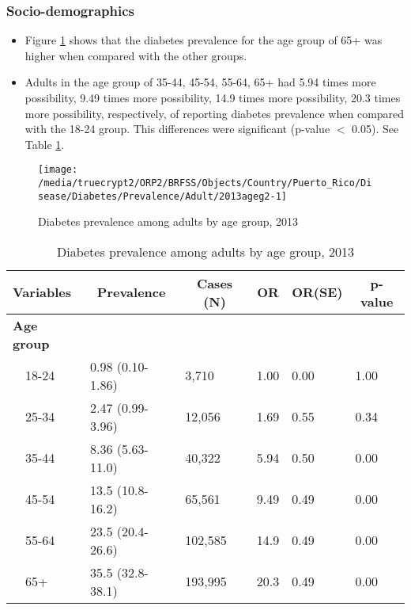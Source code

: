 \newpage
\subsubsection{Socio-demographics}

\begin{itemize}

\item Figure \ref{fig:age.Diabetes.2013} shows that the diabetes prevalence for the age group of
65+
was higher when compared with the other groups.

\item Adults in the age group of 35-44, 45-54, 55-64, 65+ had 5.94 times more possibility, 9.49 times more possibility, 14.9 times more possibility, 20.3 times more possibility, respectively, of reporting diabetes prevalence when compared with the 18-24 group. This differences were significant (p-value $<$ 0.05). See Table \ref{tab:age.Diabetes.2013}.


\end{itemize}


\begin{figure}[H]
\caption{Diabetes prevalence among adults by age group, 
2013}
\begin{knitrout}
\color{fgcolor}

{\centering \texttt{[image: /media/truecrypt2/ORP2/BRFSS/Objects/Country/Puerto\_Rico/Disease/Diabetes/Prevalence/Adult/2013ageg2-1]} 

}



\end{knitrout}
\label{fig:age.Diabetes.2013}
\end{figure}

\begin{table}[H]
\caption{Diabetes prevalence  among adults by age group, 2013\label{tab:age.Diabetes.2013}} 
\begin{center}
\begin{tabular}{llllll}
\hline\hline
\multicolumn{1}{l}{Variables}&\multicolumn{1}{c}{Prevalence}&\multicolumn{1}{c}{Cases (N)}&\multicolumn{1}{c}{OR}&\multicolumn{1}{c}{OR(SE)}&\multicolumn{1}{c}{p-value}\tabularnewline
\hline
{\bfseries Age group}&&&&&\tabularnewline
~~18-24&0.98 (0.10-1.86)&  3,710&1.00&0.00&1.00\tabularnewline
~~25-34&2.47 (0.99-3.96)& 12,056&1.69&0.55&0.34\tabularnewline
~~35-44&8.36 (5.63-11.0)& 40,322&5.94&0.50&0.00\tabularnewline
~~45-54&13.5 (10.8-16.2)& 65,561&9.49&0.49&0.00\tabularnewline
~~55-64&23.5 (20.4-26.6)&102,585&14.9&0.49&0.00\tabularnewline
~~65+&35.5 (32.8-38.1)&193,995&20.3&0.49&0.00\tabularnewline
\hline
\end{tabular}\end{center}

\end{table}


